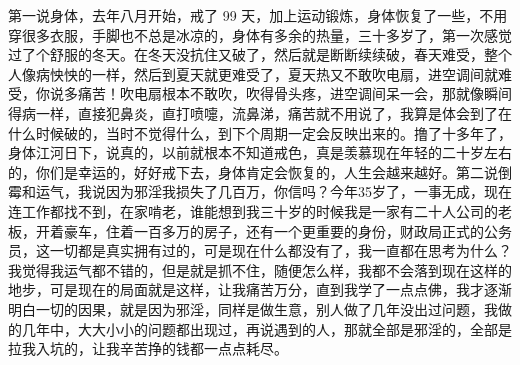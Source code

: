\begin{case}
    第一说身体，去年八月开始，戒了 99 天，加上运动锻炼，身体恢复了一些，不用穿很多衣服，手脚也不总是冰凉的，身体有多余的热量，三十多岁了，第一次感觉过了个舒服的冬天。在冬天没抗住又破了，然后就是断断续续破，春天难受，整个人像病怏怏的一样，然后到夏天就更难受了，夏天热又不敢吹电扇，进空调间就难受，你说多痛苦！吹电扇根本不敢吹，吹得骨头疼，进空调间呆一会，那就像瞬间得病一样，直接犯鼻炎，直打喷嚏，流鼻涕，痛苦就不用说了，我算是体会到了在什么时候破的，当时不觉得什么，到下个周期一定会反映出来的。撸了十多年了，身体江河日下，说真的，以前就根本不知道戒色，真是羡慕现在年轻的二十岁左右的，你们是幸运的，好好戒下去，身体肯定会恢复的，人生会越来越好。第二说倒霉和运气，我说因为邪淫我损失了几百万，你信吗？今年35岁了，一事无成，现在连工作都找不到，在家啃老，谁能想到我三十岁的时候我是一家有二十人公司的老板，开着豪车，住着一百多万的房子，还有一个更重要的身份，财政局正式的公务员，这一切都是真实拥有过的，可是现在什么都没有了，我一直都在思考为什么？我觉得我运气都不错的，但是就是抓不住，随便怎么样，我都不会落到现在这样的地步，可是现在的局面就是这样，让我痛苦万分，直到我学了一点点佛，我才逐渐明白一切的因果，就是因为邪淫，同样是做生意，别人做了几年没出过问题，我做的几年中，大大小小的问题都出现过，再说遇到的人，那就全部是邪淫的，全部是拉我入坑的，让我辛苦挣的钱都一点点耗尽。

\end{case}
